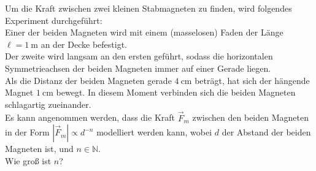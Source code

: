 \begin{Exercise}[difficulty = 3, origin = Estnisch-Finnische Physikolympiade 2014, title = Kraft zwischen Magneten, label = hangingmagnet]
	Um die Kraft zwischen zwei kleinen Stabmagneten zu finden, wird folgendes Experiment durchgeführt:\\
	Einer der beiden Magneten wird mit einem (masselosen) Faden der Länge $\ell = 1~\mathrm{m}$ an der Decke befestigt.\\
	Der zweite wird langsam an den ersten geführt, sodass die horizontalen Symmetrieachsen der beiden Magneten immer auf einer Gerade liegen.\\
	Als die Distanz der beiden Magneten gerade $4~\mathrm{cm}$ beträgt, hat sich der hängende Magnet $1~\mathrm{cm}$ bewegt. In diesem Moment verbinden sich die beiden Magneten schlagartig zueinander.\\
	Es kann angenommen werden, dass die Kraft $\vec{F}_m$ zwischen den beiden Magneten in der Form $|\vec{F}_m|\propto d^{-n}$ modelliert werden kann, wobei $d$ der Abstand der beiden Magneten ist, und $n\in \mathbb{N}$.\\
	Wie groß ist $n$?
\end{Exercise}